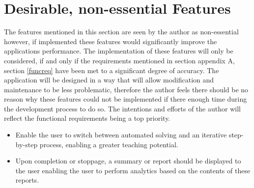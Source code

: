 \section{Desirable, non-essential Features}

The features mentioned in this section are seen by the author as non-essential however, if implemented these features would significantly improve the applications performance. The implementation of these features will only be considered, if and only if the requirements mentioned in section appendix A, section \ref{funcreq} have been met to a significant degree of accuracy. The application will be designed in a way that will allow modification and maintenance to be less problematic, therefore the author feels there should be no reason why these features could not be implemented if there enough time during the development process to do so. The intentions and efforts of the author will reflect the functional requirements being a top priority.

\begin{itemize}
\item Enable the user to switch between automated solving and an iterative step-by-step process, enabling a greater teaching potential.
\item Upon completion or stoppage, a summary or report should be displayed to the user enabling the user to perform analytics based on the contents of these reports.
\end{itemize}

